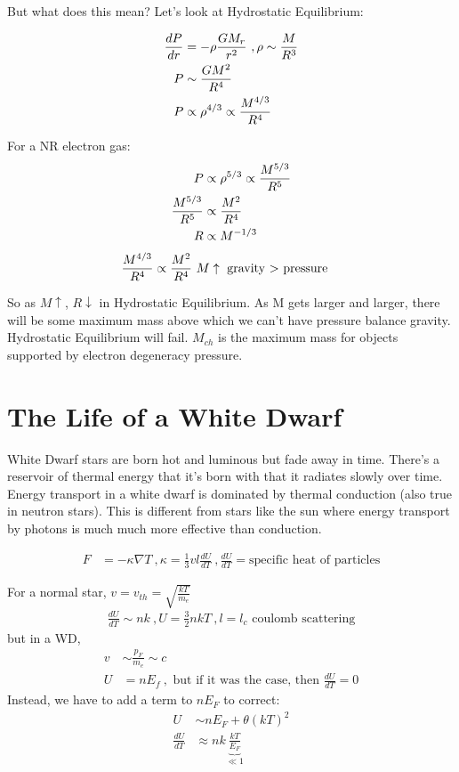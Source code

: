 But what does this mean? Let's look at Hydrostatic Equilibrium:

\begin{align}
\frac{dP}{dr} &= -\rho \frac{GM_r}{r^2}~,\rho \sim \frac{M}{R^3}\\
P &\sim \frac{GM^2}{R^4}\\
P &\propto \rho^{4/3} \propto \frac{M^{4/3}}{R^4}
\end{align}

For a NR electron gas:
\begin{align}
P &\propto \rho^{5/3} \propto \frac{M^{5/3}}{R^5}\\
\frac{M^{5/3}}{R^5}&\propto \frac{M^2}{R^4}\\
R &\propto M^{-1/3}
\end{align}
\begin{align}
\frac{M^{4/3}}{R^4} &\propto \frac{M^2}{R^4}~M\uparrow\textrm{ gravity $>$ pressure}
\end{align}

So as $M \uparrow$, $R\downarrow$ in Hydrostatic Equilibrium. As M gets larger and larger, there will be some maximum mass above which we can't have pressure balance gravity. Hydrostatic Equilibrium will fail. $M_{ch}$ is the maximum mass for objects supported by electron degeneracy pressure. 

\section{The Life of a White Dwarf}

White Dwarf stars are born hot and luminous but fade away in time. There's a reservoir of thermal energy that it's born with that it radiates slowly over time. Energy transport  in a white dwarf is dominated by thermal conduction (also true in neutron stars). This is different from stars like the sun where energy transport by photons is much much more effective than conduction.

\begin{align}
F &= -\kappa \nabla T~,\kappa = \frac{1}{3}vl\frac{dU}{dT}~, \frac{dU}{dT}= \textrm{specific heat of particles}
\end{align}

For a normal star, $v = v_{th} = \sqrt{\frac{kT}{m_e}}$
\begin{align}
\frac{dU}{dT} \sim nk~,U = \frac{3}{2}nkT~,l=l_c\textrm{ coulomb scattering}
\end{align}
but in a WD,
\begin{align}
v &\sim \frac{p_F}{m_e} \sim c\\
U &= nE_f~,\textrm{ but if it was the case, then } \frac{dU}{dT} = 0
\end{align}
Instead, we have to add a term to $nE_F$ to correct:
\begin{align}
U &\sim nE_F + \theta (kT)^2\\
\frac{dU}{dT} &\approx nk \underbrace{\frac{kT}{E_F}}_{\ll1}
\end{align}


